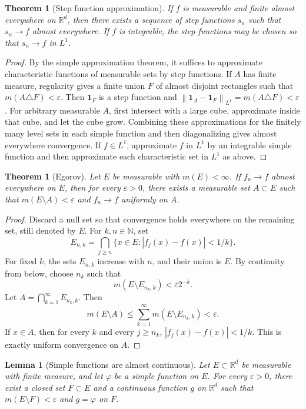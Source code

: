 \documentclass[11pt,openany]{book}
\numberwithin{equation}{chapter}
\theoremstyle{definition}
\theoremstyle{plain}
\newtheorem{theorem}[definition]{Theorem}
\newtheorem{lemma}[definition]{Lemma}
\theoremstyle{remark}
\newcommand{\R}{\mathbb{R}}
\newcommand{\N}{\mathbb{N}}
\newcommand{\eps}{\varepsilon}
\newcommand{\1}{\mathbf{1}}
\newcommand{\abs}[1]{\left\lvert #1\right\rvert}
\newcommand{\norm}[1]{\left\lVert #1\right\rVert}
\begin{document}
\begin{theorem}[Step function approximation]
If \(f\) is measurable and finite almost everywhere on \(\R^d\), then there exists a sequence of step functions \(s_n\) such that \(s_n\to f\) almost everywhere.  If \(f\) is integrable, the step functions may be chosen so that \(s_n\to f\) in \(L^1\).
\end{theorem}

\begin{proof}
By the simple approximation theorem, it suffices to approximate characteristic functions of measurable sets by step functions.  If \(A\) has finite measure, regularity gives a finite union \(F\) of almost disjoint rectangles such that \(m(A\triangle F)<\eps\).  Then \(\1_F\) is a step function and \(\norm{\1_A-\1_F}_{L^1}=m(A\triangle F)<\eps\).  For arbitrary measurable \(A\), first intersect with a large cube, approximate inside that cube, and let the cube grow.  Combining these approximations for the finitely many level sets in each simple function and then diagonalizing gives almost everywhere convergence.  If \(f\in L^1\), approximate \(f\) in \(L^1\) by an integrable simple function and then approximate each characteristic set in \(L^1\) as above.
\end{proof}

\begin{theorem}[Egorov]
Let \(E\) be measurable with \(m(E)<\infty\).  If \(f_n\to f\) almost everywhere on \(E\), then for every \(\eps>0\), there exists a measurable set \(A\subset E\) such that \(m(E\setminus A)<\eps\) and \(f_n\to f\) uniformly on \(A\).
\end{theorem}

\begin{proof}
Discard a null set so that convergence holds everywhere on the remaining set, still denoted by \(E\).  For \(k,n\in\N\), set
\[
    E_{n,k}=\bigcap_{j\ge n}\{x\in E:\abs{f_j(x)-f(x)}<1/k\}.
\]
For fixed \(k\), the sets \(E_{n,k}\) increase with \(n\), and their union is \(E\).  By continuity from below, choose \(n_k\) such that
\[
    m(E\setminus E_{n_k,k})<\eps 2^{-k}.
\]
Let \(A=\bigcap_{k=1}^\infty E_{n_k,k}\).  Then
\[
    m(E\setminus A)
    \le\sum_{k=1}^\infty m(E\setminus E_{n_k,k})<\eps.
\]
If \(x\in A\), then for every \(k\) and every \(j\ge n_k\), \(\abs{f_j(x)-f(x)}<1/k\).  This is exactly uniform convergence on \(A\).
\end{proof}

\begin{lemma}[Simple functions are almost continuous]
Let \(E\subset\R^d\) be measurable with finite measure, and let \(\varphi\) be a simple function on \(E\).  For every \(\eps>0\), there exist a closed set \(F\subset E\) and a continuous function \(g\) on \(\R^d\) such that \(m(E\setminus F)<\eps\) and \(g=\varphi\) on \(F\).
\end{lemma}
\end{document}
